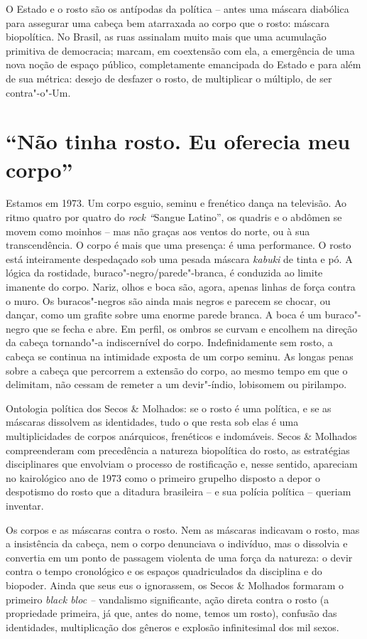 O Estado e o rosto são os antípodas da política -- antes uma máscara
diabólica para assegurar uma cabeça bem atarraxada ao corpo que o rosto:
máscara biopolítica. No Brasil, as ruas assinalam muito mais que uma
acumulação primitiva de democracia; marcam, em coextensão com ela, a
emergência de uma nova noção de espaço público, completamente emancipada
do Estado e para além de sua métrica: desejo de desfazer o rosto, de
multiplicar o múltiplo, de ser contra"-o"-Um.

\section{``Não tinha rosto. Eu oferecia meu corpo''}

Estamos em 1973. Um corpo esguio, seminu e frenético dança na televisão.
Ao ritmo quatro por quatro do \emph{rock ``}Sangue Latino'', os quadris
e o abdômen se movem como moinhos -- mas não graças aos ventos do norte,
ou à sua transcendência. O corpo é mais que uma presença: é uma
performance. O rosto está inteiramente despedaçado sob uma pesada
máscara \emph{kabuki} de tinta e pó. A lógica da rostidade,
buraco"-negro/parede"-branca, é conduzida ao limite imanente do corpo.
Nariz, olhos e boca são, agora, apenas linhas de força contra o muro. Os
buracos"-negros são ainda mais negros e parecem se chocar, ou dançar,
como um grafite sobre uma enorme parede branca. A boca é um buraco"-negro
que se fecha e abre. Em perfil, os ombros se curvam e encolhem na
direção da cabeça tornando"-a indiscernível do corpo. Indefinidamente sem
rosto, a cabeça se continua na intimidade exposta de um corpo seminu. As
longas penas sobre a cabeça que percorrem a extensão do corpo, ao mesmo
tempo em que o delimitam, não cessam de remeter a um devir"-índio,
lobisomem ou pirilampo.

Ontologia política dos Secos \& Molhados: se o rosto é uma política, e
se as máscaras dissolvem as identidades, tudo o que resta sob elas é uma
multiplicidades de corpos anárquicos, frenéticos e indomáveis. Secos \&
Molhados compreenderam com precedência a natureza biopolítica do rosto,
as estratégias disciplinares que envolviam o processo de rostificação e,
nesse sentido, apareciam no kairológico ano de 1973 como o primeiro
grupelho disposto a depor o despotismo do rosto que a ditadura
brasileira -- e sua polícia política -- queriam inventar.

Os corpos e as máscaras contra o rosto. Nem as máscaras indicavam o
rosto, mas a insistência da cabeça, nem o corpo denunciava o indivíduo,
mas o dissolvia e convertia em um ponto de passagem violenta de uma
força da natureza: o devir contra o tempo cronológico e os espaços
quadriculados da disciplina e do biopoder. Ainda que seus eus o
ignorassem, os Secos \& Molhados formaram o primeiro \emph{black bloc --
}vandalismo significante, ação direta contra o rosto (a propriedade
primeira, já que, antes do nome, temos um rosto), confusão das
identidades, multiplicação dos gêneros e explosão infinitesimal dos mil
sexos.

